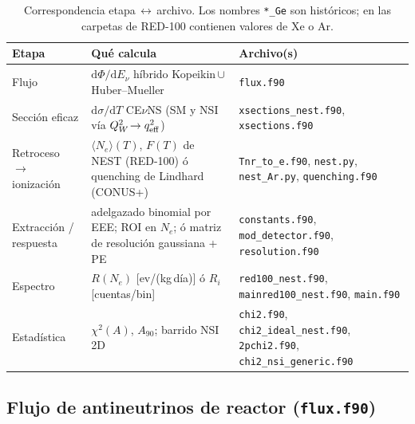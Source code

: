\documentclass[11pt,a4paper]{article}
\newcommand{\QW}{Q_{W}}
\newcommand{\Enu}{E_{\nu}}
\newcommand{\Tnr}{T}
\newcommand{\Ne}{N_{e}}
\newcommand{\qeff}{q_{\rm eff}}
\newcommand{\code}[1]{\texttt{#1}}
\newcommand{\dd}{\mathrm{d}}
\begin{document}
\begin{table}[h]
\centering
\small
\begin{tabular}{@{}p{3.0cm}p{6.4cm}p{5.4cm}@{}}
\toprule
\textbf{Etapa} & \textbf{Qu\'e calcula} & \textbf{Archivo(s)} \\
\midrule
Flujo             & $\dd\Phi/\dd\Enu$ h\'ibrido Kopeikin\,$\cup$\,Huber--Mueller & \code{flux.f90} \\
Secci\'on eficaz  & $\dd\sigma/\dd\Tnr$ CE$\nu$NS (SM y NSI v\'ia $\QW^{2}\!\to \qeff^{2}$) & \code{xsections\_nest.f90}, \code{xsections.f90} \\
Retroceso $\to$ ionizaci\'on & $\langle\Ne\rangle(\Tnr)$, $F(\Tnr)$ de NEST (RED-100) \'o quenching de Lindhard (CONUS+) & \code{Tnr\_to\_e.f90}, \code{nest.py}, \code{nest\_Ar.py}, \code{quenching.f90} \\
Extracci\'on / respuesta & adelgazado binomial por EEE; ROI en $\Ne$; \'o matriz de resoluci\'on gaussiana + PE & \code{constants.f90}, \code{mod\_detector.f90}, \code{resolution.f90} \\
Espectro          & $R(\Ne)$ [ev/(kg\,d\'ia)] \'o $R_{i}$ [cuentas/bin] & \code{red100\_nest.f90}, \code{mainred100\_nest.f90}, \code{main.f90} \\
Estad\'istica     & $\chi^{2}(A)$, $A_{90}$; barrido NSI 2D & \code{chi2.f90}, \code{chi2\_ideal\_nest.f90}, \code{2pchi2.f90}, \code{chi2\_nsi\_generic.f90} \\
\bottomrule
\end{tabular}
\caption{Correspondencia etapa\,$\leftrightarrow$\,archivo. Los nombres
\code{*\_Ge} son hist\'oricos; en las carpetas de RED-100 contienen valores de
Xe o Ar.}
\label{tab:pipeline}
\end{table}

\subsection{Flujo de antineutrinos de reactor (\code{flux.f90})}
\label{sec:flux}
\end{document}
